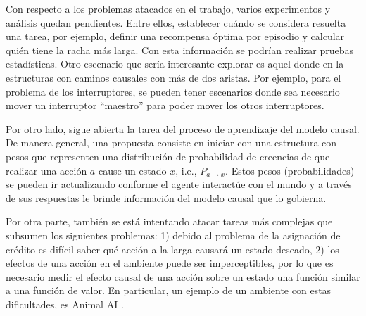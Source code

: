 Con respecto a los problemas atacados en el trabajo,
varios experimentos y análisis quedan pendientes. Entre ellos, 
establecer cuándo se considera resuelta una tarea, por ejemplo, 
definir una recompensa óptima por episodio y 
calcular quién tiene la racha más larga. Con esta información 
se podrían realizar pruebas estadísticas. Otro escenario que sería interesante
explorar es aquel donde en la estructuras con caminos causales con más de dos aristas. Por ejemplo, para el problema de los interruptores, se pueden
tener escenarios donde sea necesario mover un interruptor ``maestro'' para
poder mover los otros interruptores.

Por otro lado, sigue abierta la tarea del proceso de aprendizaje del modelo
causal. De manera general, una propuesta consiste en iniciar con una estructura con pesos que representen 
una distribución de probabilidad de creencias de que realizar una acción $a$ cause un estado $x$, i.e., $P_{a\rightarrow x}$. Estos pesos (probabilidades) se pueden
ir actualizando conforme el agente interactúe con el mundo y
a través de sus respuestas le brinde información del modelo causal que lo gobierna.


Por otra parte, también se está intentando atacar tareas más 
complejas que subsumen los siguientes problemas: 1) debido al problema de la asignación de crédito es difícil saber qué acción a la larga causará un estado deseado, 2) los efectos de una acción en el ambiente puede ser imperceptibles, por lo que es necesario medir el efecto causal de una acción sobre un estado una función similar a una función de valor. En particular, un ejemplo de un ambiente con estas dificultades, es Animal AI \cite{beyret2019animalai}.


